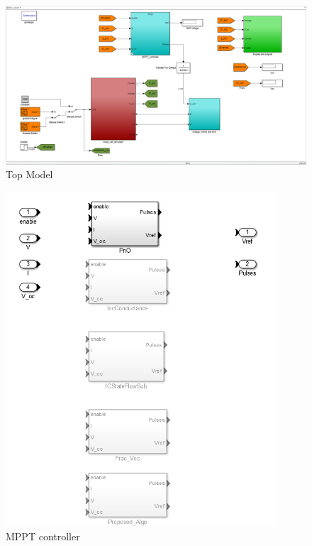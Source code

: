 \begin{figure}[H]
  \begin{center}
	  \includegraphics[width=\textwidth]{images/Top_level_mod}
	  \caption{Top Model }
	  \label{fig:Model_top}
  \end{center}
\end{figure}

\begin{figure}[H]
  \begin{center}
	  \includegraphics[width=0.9\textwidth]{images/controller_mod}
	  \caption{MPPT controller }
	  \label{fig:Controller_mod}
  \end{center}
\end{figure}
 



